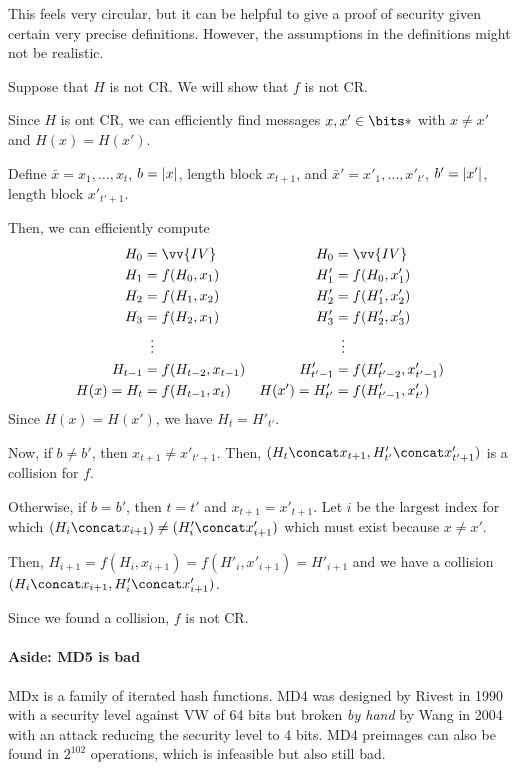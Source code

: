 \documentclass[class=co487,tikz,minted,notes]{agony}
\begin{document}
This feels very circular, but it can be helpful to give a proof of security
given certain very precise definitions.
However, the assumptions in the definitions might not be realistic.

\begin{prf}
  Suppose that $H$ is not CR. We will show that $f$ is not CR.

  Since $H$ is ont CR, we can efficiently find messages $x,x' \in \bits*$
  with $x \neq x'$ and $H(x) = H(x')$.

  Define $\bar x = x_1,\dotsc,x_t$, $b = \abs{x}$, length block $x_{t+1}$,
  and $\bar x' = x'_1,\dotsc,x'_{t'}$, $b' = \abs{x'}$, length block $x'_{t'+1}$.

  Then, we can efficiently compute
  \begin{align*}
    H_0        & = \vv{IV}            & H_0             & = \vv{IV}                \\
    H_1        & = f(H_0,x_1)         & H'_1            & = f(H_0,x'_1)            \\
    H_2        & = f(H_1,x_2)         & H'_2            & = f(H'_1,x'_2)           \\
    H_3        & = f(H_2,x_1)         & H'_3            & = f(H'_2,x'_3)           \\
               & \vdotswithin{=}      &                 & \vdotswithin{=}          \\
    H_{t-1}    & = f(H_{t-2},x_{t-1}) & H'_{t'-1}       & = f(H'_{t'-2},x'_{t'-1}) \\
    H(x) = H_t & = f(H_{t-1},x_t)     & H(x') = H'_{t'} & = f(H'_{t'-1},x'_{t'})
  \end{align*}
  Since $H(x) = H(x')$, we have $H_t = H'_{t'}$.

  Now, if $b \neq b'$, then $x_{t+1} \neq x'_{t'+1}$.
  Then, $(H_t \concat x_{t+1}, H'_{t'} \concat x'_{t'+1})$ is a collision for $f$.

  Otherwise, if $b = b'$, then $t = t'$ and $x_{t+1} = x'_{t+1}$.
  Let $i$ be the largest index for which $(H_i \concat x_{i+1}) \neq (H'_i \concat x'_{i+1})$
  which must exist because $x \neq x'$.

  Then, $H_{i+1} = f(H_i,x_{i+1}) = f(H'_i,x'_{i+1}) = H'_{i+1}$
  and we have a collision $(H_i\concat x_{i+1}, H'_i \concat x'_{i+1})$.

  Since we found a collision, $f$ is not CR.
\end{prf}

\paragraph{Aside: MD5 is bad}
MDx is a family of iterated hash functions.
MD4 was designed by Rivest in 1990 with a security level against VW of 64 bits
but broken \emph{by hand} by Wang in 2004 with an attack reducing the security level to 4 bits.
MD4 preimages can also be found in $2^{102}$ operations, which is infeasible but also still bad.
\end{document}
